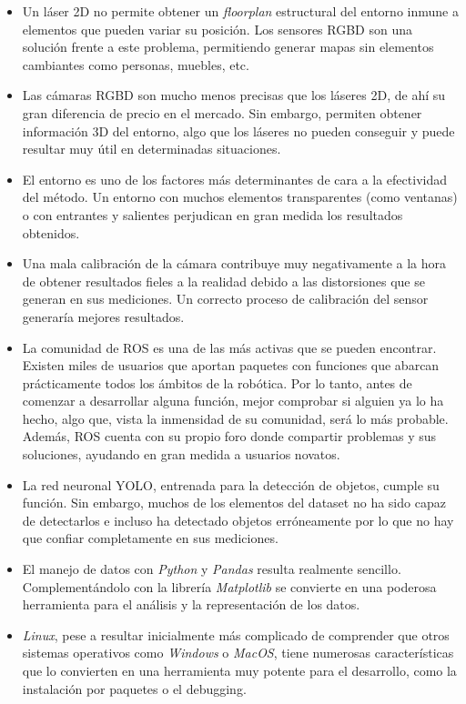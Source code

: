 \begin{itemize}
	\item Un láser 2D no permite obtener un \textit{floorplan} estructural del entorno inmune a elementos que pueden variar su posición. Los sensores RGBD son una solución frente a este problema, permitiendo generar mapas sin elementos cambiantes como personas, muebles, etc.
	\item Las cámaras RGBD son mucho menos precisas que los láseres 2D, de ahí su gran diferencia de precio en el mercado. Sin embargo, permiten obtener información 3D del entorno, algo que los láseres no pueden conseguir y puede resultar muy útil en determinadas situaciones.
	\item El entorno es uno de los factores más determinantes de cara a la efectividad del método. Un entorno con muchos elementos transparentes (como ventanas) o con entrantes y salientes perjudican en gran medida los resultados obtenidos.
	\item Una mala calibración de la cámara contribuye muy negativamente a la hora de obtener resultados fieles a la realidad debido a las distorsiones que se generan en sus mediciones. Un correcto proceso de calibración del sensor generaría mejores resultados.
	\item La comunidad de ROS es una de las más activas que se pueden encontrar. Existen miles de usuarios que aportan paquetes con funciones que abarcan prácticamente todos los ámbitos de la robótica. Por lo tanto, antes de comenzar a desarrollar alguna función, mejor comprobar si alguien ya lo ha hecho, algo que, vista la inmensidad de su comunidad, será lo más probable. Además, ROS cuenta con su propio foro donde compartir problemas y sus soluciones, ayudando en gran medida a usuarios novatos.
	\item La red neuronal YOLO, entrenada para la detección de objetos, cumple su función. Sin embargo, muchos de los elementos del dataset no ha sido capaz de detectarlos e incluso ha detectado objetos erróneamente por lo que no hay que confiar completamente en sus mediciones. 
	\item El manejo de datos con \textit{Python} y \textit{Pandas}
 resulta realmente sencillo. Complementándolo con la librería \textit{Matplotlib} se convierte en una poderosa herramienta para el análisis y la representación de los datos.
 	\item \textit{Linux}, pese a resultar inicialmente más complicado de comprender que otros sistemas operativos como \textit{Windows} o \textit{MacOS}, tiene numerosas características que lo convierten en una herramienta muy potente para el desarrollo, como la instalación por paquetes o el debugging.

\end{itemize}

